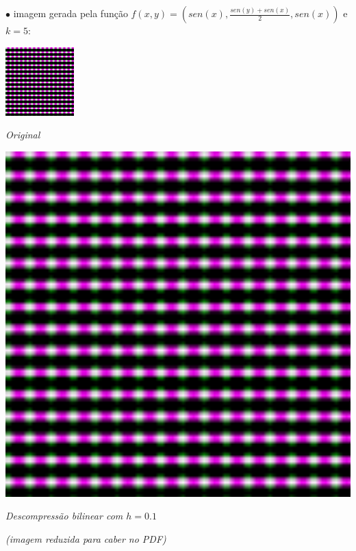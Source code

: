 \documentclass{article}
\begin{document}
\newpage
\qquad $\bullet$ imagem gerada pela função $f(x, y) = (sen(x), \frac{sen(y) + sen(x)}{2}, sen(x))$ e $k = 5$:

\begin{center}
\includegraphics{color.png}

\emph{Original}

\bigskip
\includegraphics[scale=.45]{bih01.png}

\emph{Descompressão bilinear com $h = 0.1$}

\emph{(imagem reduzida para caber no PDF)}


\end{center}
\end{document}
